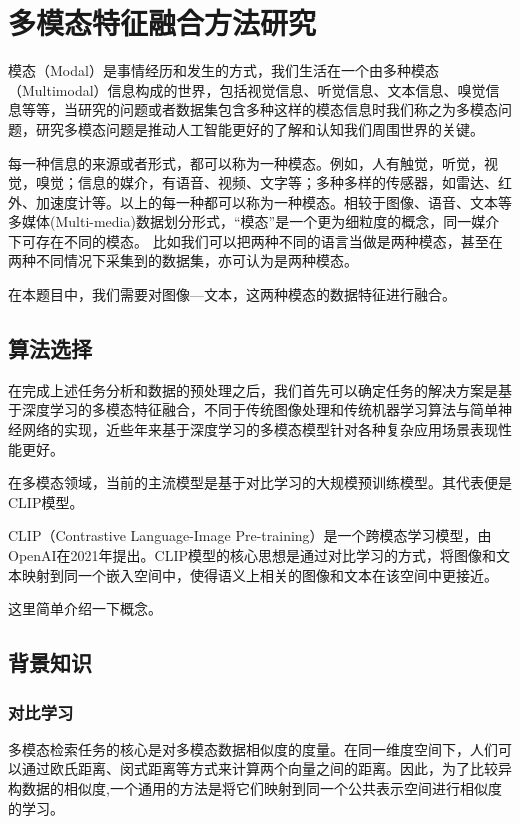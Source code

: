 \documentclass[a4paper]{zreport}
\begin{document}
\section{多模态特征融合方法研究}

模态（Modal）是事情经历和发生的方式，我们生活在一个由多种模态（Multimodal）信息构成的世界，包括视觉信息、听觉信息、文本信息、嗅觉信息等等，当研究的问题或者数据集包含多种这样的模态信息时我们称之为多模态问题，研究多模态问题是推动人工智能更好的了解和认知我们周围世界的关键。

每一种信息的来源或者形式，都可以称为一种模态。例如，人有触觉，听觉，视觉，嗅觉；信息的媒介，有语音、视频、文字等；多种多样的传感器，如雷达、红外、加速度计等。以上的每一种都可以称为一种模态。相较于图像、语音、文本等多媒体(Multi-media)数据划分形式，“模态”是一个更为细粒度的概念，同一媒介下可存在不同的模态。 比如我们可以把两种不同的语言当做是两种模态，甚至在两种不同情况下采集到的数据集，亦可认为是两种模态。

在本题目中，我们需要对图像—文本，这两种模态的数据特征进行融合。

\subsection{算法选择}

在完成上述任务分析和数据的预处理之后，我们首先可以确定任务的解决方案是基于深度学习的多模态特征融合，不同于传统图像处理和传统机器学习算法与简单神经网络的实现，近些年来基于深度学习的多模态模型针对各种复杂应用场景表现性能更好。

在多模态领域，当前的主流模型是基于对比学习的大规模预训练模型。其代表便是CLIP模型。

CLIP（Contrastive Language-Image Pre-training）是一个跨模态学习模型\cite{clip}，由OpenAI在2021年提出。CLIP模型的核心思想是通过对比学习的方式，将图像和文本映射到同一个嵌入空间中，使得语义上相关的图像和文本在该空间中更接近。

这里简单介绍一下概念。

\subsection{背景知识}

\subsubsection{对比学习}

多模态检索任务的核心是对多模态数据相似度的度量。在同一维度空间下，人们可以通过欧氏距离、闵式距离等方式来计算两个向量之间的距离。因此，为了比较异构数据的相似度,一个通用的方法是将它们映射到同一个公共表示空间进行相似度的学习。
\end{document}
